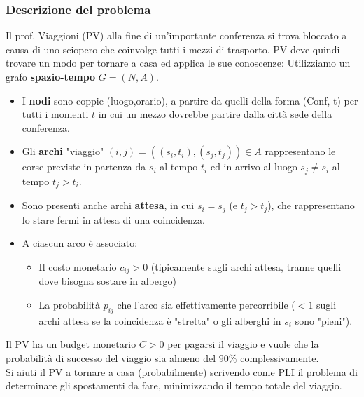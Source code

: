 \documentclass[12pt,a4paper]{article}
\begin{document}
\subsubsection{Descrizione del problema}
Il prof. Viaggioni (PV) alla fine di un'importante conferenza si trova bloccato a causa di uno sciopero che coinvolge tutti i mezzi di trasporto. PV deve quindi trovare un modo per tornare a casa ed applica le sue conoscenze:
Utilizziamo un grafo \textbf{spazio-tempo} $G = (N,A)$.
\begin{itemize}
    \item I \textbf{nodi} sono coppie (luogo,orario), a partire da quelli della forma (Conf, t) per tutti i momenti $t$ in cui un mezzo dovrebbe partire dalla città sede della conferenza.
    \item Gli \textbf{archi} "viaggio" $(i,j) = ((s_i,t_i),(s_j,t_j)) \in A$ rappresentano le corse previste in partenza da $s_i$ al tempo $t_i$ ed in arrivo al luogo $s_j \ne s_i$ al tempo $t_j > t_i$.
    \item Sono presenti anche archi \textbf{attesa}, in cui $s_i = s_j$ (e $t_j > t_j$), che rappresentano lo stare fermi in attesa di una coincidenza.
    \item A ciascun arco è associato:
    \begin{itemize}
        \item Il costo monetario $c_{ij} > 0$ (tipicamente sugli archi attesa, tranne quelli dove bisogna sostare in albergo)
        \item La probabilità $p_{ij}$ che l'arco sia effettivamente percorribile ($< 1$ sugli archi attesa se la coincidenza è "stretta" o gli alberghi in $s_i$ sono "pieni").
    \end{itemize}
\end{itemize}
Il PV ha un budget monetario $C > 0$ per pagarsi il viaggio e vuole che la probabilità di successo del viaggio sia almeno del $90\%$ complessivamente.\\
Si aiuti il PV a tornare a casa (probabilmente) scrivendo come PLI il problema di determinare gli spostamenti da fare, minimizzando il tempo totale del viaggio.
\end{document}
